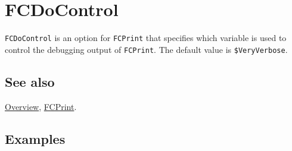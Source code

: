 \documentclass[../FeynCalcManual.tex]{subfiles}
\begin{document}
\hypertarget{fcdocontrol}{
\section{FCDoControl}\label{fcdocontrol}}

\texttt{FCDoControl} is an option for \texttt{FCPrint} that specifies
which variable is used to control the debugging output of
\texttt{FCPrint}. The default value is \texttt{\$VeryVerbose}.

\subsection{See also}

\hyperlink{toc}{Overview}, \hyperlink{fcprint}{FCPrint}.

\subsection{Examples}
\end{document}
